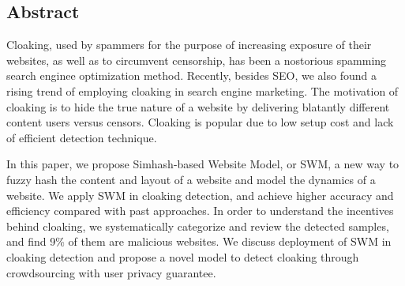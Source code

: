 
\subsection*{Abstract}
Cloaking, used by spammers for the purpose of increasing exposure of
their websites, as well as to circumvent censorship, has been a nostorious
spamming search enginee optimization method. Recently, besides SEO, we also
found a rising trend of employing cloaking in search engine marketing. The motivation of cloaking 
is to hide the true nature of a website by delivering blatantly different 
content users versus censors. Cloaking is popular due to low setup cost 
and lack of efficient detection technique.

In this paper, we propose Simhash-based Website Model, or SWM, a new way to
fuzzy hash the content and layout of a
website and model the dynamics of a website. 
We apply SWM in cloaking detection, and achieve higher accuracy and efficiency
compared with past approaches. In order to understand the incentives
behind cloaking, we systematically
categorize and review the detected samples, and find 9\% of them are malicious
websites. We discuss deployment of SWM in cloaking detection and
propose a novel model to
detect cloaking through crowdsourcing with user privacy guarantee.

